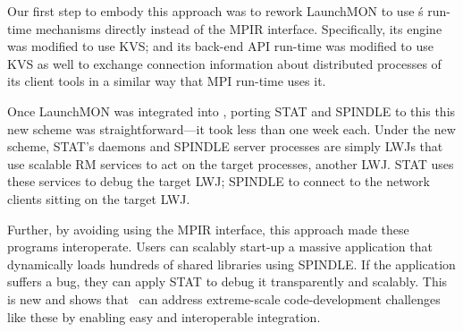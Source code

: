 Our first step to embody this approach was to rework LaunchMON
to use \flux\'s run-time mechanisms directly instead 
of the MPIR interface. Specifically, its engine
was modified to use KVS; and its back-end 
API run-time was modified to use KVS as well 
to exchange connection information about 
distributed processes of its client tools in a similar way that MPI run-time 
uses it. 

Once LaunchMON was integrated into \flux, porting 
STAT and SPINDLE to this this new scheme was 
straightforward---it took less than one week each.
Under the new scheme, STAT's daemons 
and SPINDLE server processes are simply LWJs 
that use scalable RM services to act on the target processes, 
another LWJ. STAT uses these services to debug the 
target LWJ; SPINDLE to connect to the network clients sitting on the target LWJ.

Further, by avoiding using the MPIR interface, 
this approach made these programs interoperate.
Users can scalably start-up a massive application 
that dynamically loads hundreds of shared libraries 
using SPINDLE.
If the application suffers a bug, they can apply
STAT to debug it transparently and scalably.
This is new and shows that \flux\ can address extreme-scale 
code-development challenges like these by enabling easy and interoperable 
integration. 
